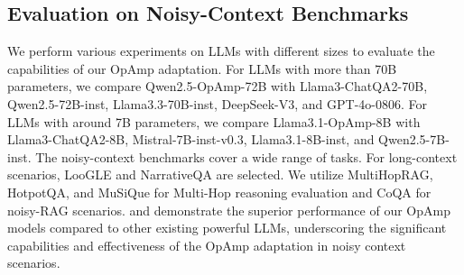 \subsection{Evaluation on Noisy-Context Benchmarks}

We perform various experiments on LLMs with different sizes to evaluate the capabilities of our OpAmp adaptation.
For LLMs with more than 70B parameters, we compare Qwen2.5-OpAmp-72B with Llama3-ChatQA2-70B, Qwen2.5-72B-inst, Llama3.3-70B-inst, DeepSeek-V3, and GPT-4o-0806.
For LLMs with around 7B parameters, we compare Llama3.1-OpAmp-8B with Llama3-ChatQA2-8B, Mistral-7B-inst-v0.3, Llama3.1-8B-inst, and Qwen2.5-7B-inst.
The noisy-context benchmarks cover a wide range of tasks.
For long-context scenarios, LooGLE and NarrativeQA are selected.
We utilize MultiHopRAG, HotpotQA, and MuSiQue for Multi-Hop reasoning evaluation and CoQA for noisy-RAG scenarios.
 and  demonstrate the superior performance of our OpAmp models compared to other existing powerful LLMs, underscoring the significant capabilities and effectiveness of the OpAmp adaptation in noisy context scenarios.

\begin{table*}[tb!]
\centering
\setlength\tabcolsep{3.6pt}
\caption{Ablation studies on various noisy context benchmarks using Llama3.1-8B-base as the base model.
We bold the highest scores for each benchmark.}
\label{table:ab_study_cmrr}
\end{table*}

